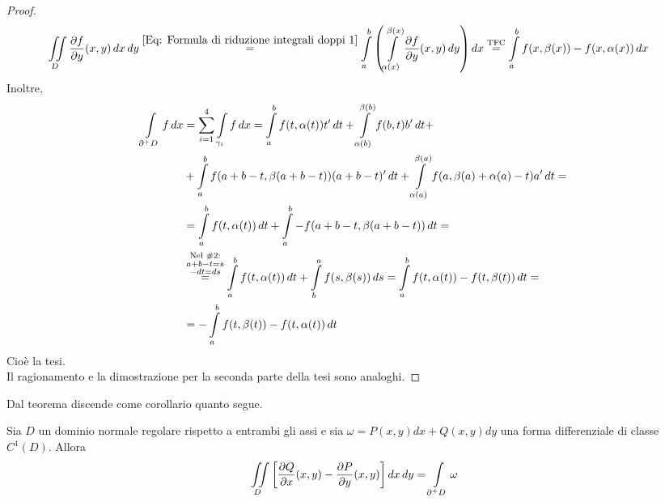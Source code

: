 \begin{proof}
 \begin{equation*}
    \begin{aligned}
     \iint\limits_D{\frac{\partial f}{\partial y}(x,y)}\,dx\,dy &\overset{\eqref{Eq: Formula di riduzione integrali doppi 1}}{=} \int\limits_{a}^{b}{\left( \int\limits_{\alpha(x)}^{\beta(x)}\frac{\partial f}{\partial y}(x,y)\,dy \right)}\, dx \overset{\text{TFC}}{=}\int\limits_{a}^{b}{ f(x, \beta(x))- f(x, \alpha(x))}\, dx
     \end{aligned}
 \end{equation*}
Inoltre, 
\begin{equation*}
\begin{aligned}
    \int\limits_{\partial^+ D}{f}\, dx &= \sum\limits_{i=1}^{4} \int\limits_{\gamma_i}{f}\,dx =
    \int\limits_{a}^{b}{f(t, \alpha(t)) t'}\, dt+ \int\limits_{\alpha(b)}^{\beta(b)}{f(b,t)b'}\, dt +\\
    &+\int\limits_{a}^{b}{f(a+b-t, \beta(a+b-t))(a+b-t)'}\, dt + \int\limits_{\alpha(a)}^{\beta(a)}{f(a, \beta(a)+\alpha(a)-t) a'}\, dt=\\
    &= \int\limits_{a}^{b}{f(t, \alpha(t))}\, dt + \int\limits_{a}^{b}{-f(a+b-t, \beta(a+b-t))}\, dt =\\
    &\overset{\substack{\text{Nel }\#2:\\ a+b-t=s\\ -dt=ds}}{=} \int\limits_a^b{f(t, \alpha(t))}\, dt + \int\limits_b^a{f(s, \beta(s))}\, ds = \int\limits_{a}^{b}{f(t, \alpha(t))- f(t, \beta(t))}\, dt=\\
    &=-\int\limits_{a}^{b}{ f(t, \beta(t))- f(t, \alpha(t))}\, dt
    \end{aligned}
\end{equation*}
Cioè la tesi.\\
Il ragionamento e la dimostrazione per la seconda parte della tesi sono analoghi.
 \end{proof}
 Dal teorema discende come corollario quanto segue.
 \begin{corollary}
     Sia $D$ un dominio normale regolare rispetto a entrambi gli assi e sia $\omega= P(x,y)dx+ Q(x,y)dy$ una forma differenziale di classe $C^1(D)$. Allora
     \begin{equation*}
         \iint\limits_{D}{\left[\frac{\partial Q}{\partial x} (x,y)- \frac{\partial P}{\partial y}(x,y)\right]}\, dx\, dy = \int\limits_{\partial^+ D} \omega
     \end{equation*}
\end{corollary}
